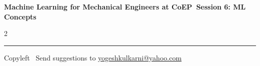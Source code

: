 \documentclass[8pt,landscape]{article}
\begin{document}
\footnotesize

\begin{center}
\Large{\textbf{Machine Learning for Mechanical Engineers at CoEP\ Session 6: ML Concepts}}
\end{center}

\begin{multicols}{2}

\end{multicols}

\rule{\linewidth}{0.25pt}
\scriptsize
Copyleft \textcopyleft\  Send suggestions to
\href{http://www.yogeshkulkarni.com}{yogeshkulkarni@yahoo.com}
\end{document}
